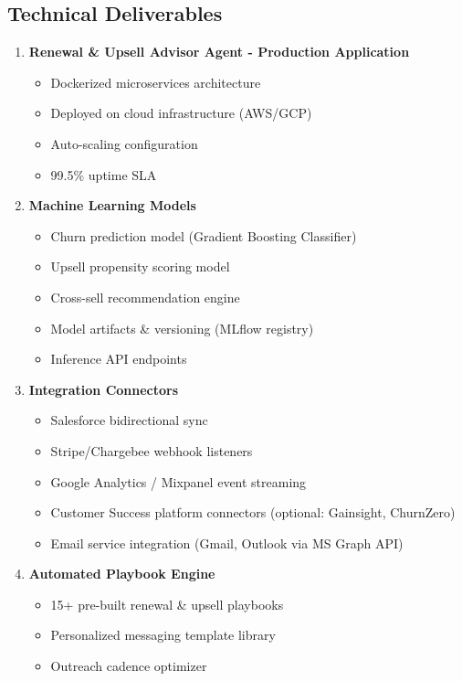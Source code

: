 \documentclass[12pt,a4paper]{article}
\begin{document}
\subsection{Technical Deliverables}
\begin{enumerate}
    \item \textbf{Renewal \& Upsell Advisor Agent - Production Application}
    \begin{itemize}
        \item Dockerized microservices architecture
        \item Deployed on cloud infrastructure (AWS/GCP)
        \item Auto-scaling configuration
        \item 99.5\% uptime SLA
    \end{itemize}
    \item \textbf{Machine Learning Models}
    \begin{itemize}
        \item Churn prediction model (Gradient Boosting Classifier)
        \item Upsell propensity scoring model
        \item Cross-sell recommendation engine
        \item Model artifacts \& versioning (MLflow registry)
        \item Inference API endpoints
    \end{itemize}
    \item \textbf{Integration Connectors}
    \begin{itemize}
        \item Salesforce bidirectional sync
        \item Stripe/Chargebee webhook listeners
        \item Google Analytics / Mixpanel event streaming
        \item Customer Success platform connectors (optional: Gainsight, ChurnZero)
        \item Email service integration (Gmail, Outlook via MS Graph API)
    \end{itemize}
    \item \textbf{Automated Playbook Engine}
    \begin{itemize}
        \item 15+ pre-built renewal \& upsell playbooks
        \item Personalized messaging template library
        \item Outreach cadence optimizer

\end{itemize}
\end{enumerate}
\end{document}

